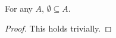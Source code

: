\guard




\begin{prop}
\label{prop:emptysetIsSubsetOfEverySet}
  For any $A$, $\emptyset\subseteq A$.
\end{prop}
\begin{proof}
  This holds trivially.
\end{proof}
